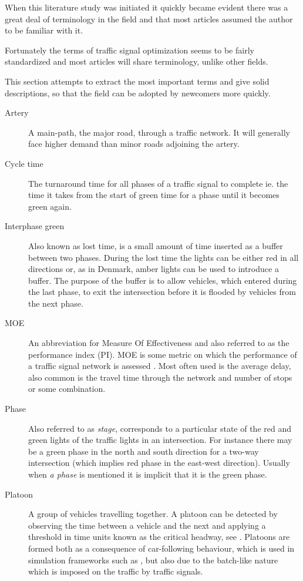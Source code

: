 \label{vocabulary}
When this literature study was initiated it quickly became evident there was a great deal of terminology in the field and that most articles assumed the author to be familiar with it. 

Fortunately the terms of traffic signal optimization seems to be fairly standardized and most articles will share terminology, unlike other fields.

This section attempts to extract the most important terms and give solid descriptions, so that the field can be adopted by newcomers more quickly.

\begin{description}

\item[Artery] A main-path, the major road, through a traffic network. It will generally face higher demand than minor roads adjoining the artery.
			
	\item[Cycle time] The turnaround time for all phases of a traffic signal to complete ie. the time it takes from the start of green time for a phase until it becomes green again.

\item[Interphase green] Also known as lost time, is a small amount of time inserted as a buffer between two phases. During the lost time the lights can be either red in all directions or, as in Denmark, amber lights can be used to introduce a buffer. The purpose of the buffer is to allow vehicles, which entered during the last phase, to exit the intersection before it is flooded by vehicles from the next phase.

	\item[MOE] An abbreviation for Measure Of Effectiveness and also referred to as the performance index (PI). MOE is some metric on which the performance of a traffic signal network is assessed .
	Most often used is the average delay, also common is the travel time through the network and number of stops or some combination.
	
	\item[Phase] Also referred to as \textit{stage}, corresponds to a particular state of the red and green lights of the traffic lights in an intersection. 
	For instance there may be a green phase in the north and south direction for a two-way intersection (which implies red phase in the east-west direction). Usually when \textit{a phase} is mentioned it is implicit that it is the green phase.
	
	\item[Platoon] A group of vehicles travelling together. A platoon can be detected by observing the time between a vehicle and the next and applying a threshold in time units known as the critical headway, see \cite[sct. 2]{25}. 
Platoons are formed both as a consequence of car-following behaviour, which is used in simulation frameworks such as \cite{treiber-2000-62}, but also due to the batch-like nature which is imposed on the traffic by traffic signals.


\end{description}
